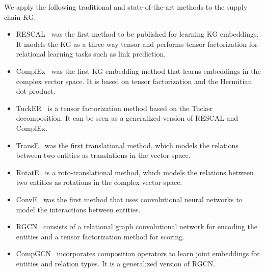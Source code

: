 \documentclass[
]{ceurart}
\begin{document}
We apply the following traditional and state-of-the-art methods to the supply chain KG:
\begin{itemize}
    \item RESCAL~\cite{nickel2011} was the first method to be published for learning KG embeddings. It models the KG as a three-way tensor and performs tensor factorization for relational learning tasks such as link prediction.
    \item ComplEx~\cite{trouillon2016} was the first KG embedding method that learns embeddings in the complex vector space. It is based on tensor factorization and the Hermitian dot product.
    \item TuckER~\cite{balazevic2019} is a tensor factorization method based on the Tucker decomposition. It can be seen as a generalized version of RESCAL and ComplEx.
    \item TransE~\cite{bordes2013} was the first translational method, which models the relations between two entities as translations in the vector space.
    \item RotatE~\cite{sun2019} is a roto-translational method, which models the relations between two entities as rotations in the complex vector space.
    \item ConvE~\cite{dettmers2018} was the first method that uses convolutional neural networks to model the interactions between entities.
    \item RGCN~\cite{schlichtkrull2018} consists of a relational graph convolutional network for encoding the entities and a tensor factorization method for scoring.
    \item CompGCN~\cite{vashishth2020} incorporates composition operators to learn joint embeddings for entities and relation types. It is a generalized version of RGCN.
\end{itemize}
\end{document}
